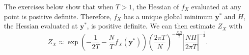 The exercises below show that when $T > 1$, the Hessian of $f_X$ evaluated at any point is positive definite. Therefore, $f_X$ has a unique global minimum $\mathbf{y}^*$ and $H$, the Hessian evaluated at $\mathbf{y}^*$, is positive definite. We can then estimate $Z_X$ with
%
\begin{equation}
Z_X \approx \exp\left(-\frac{1}{2T}-\frac{N}{T}f_X(\mathbf{y}^*)\right)\left(\frac{2\pi T}{N}\right)^{-\frac{KD}{2}}\left|\frac{NH}{2\pi T}\right|^{-\frac{1}{2}}.
\end{equation}
%

%
%
%
%
